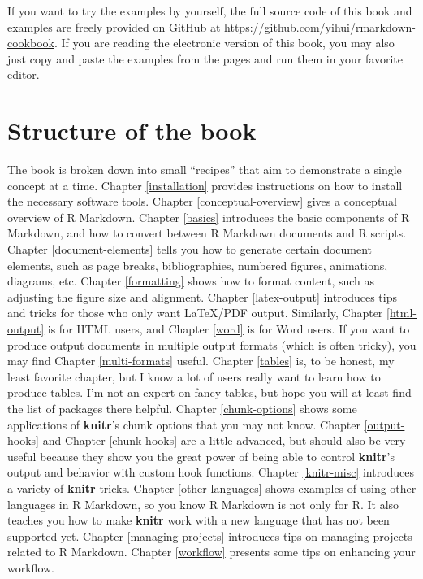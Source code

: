 \documentclass[
  11pt,
]{krantz}
\begin{document}
If you want to try the examples by yourself, the full source code of this book and examples are freely provided on GitHub at \url{https://github.com/yihui/rmarkdown-cookbook}. If you are reading the electronic version of this book, you may also just copy and paste the examples from the pages and run them in your favorite editor.

\hypertarget{structure-of-the-book}{%
\section*{Structure of the book}\label{structure-of-the-book}}


The book is broken down into small ``recipes'' that aim to demonstrate a single concept at a time. Chapter \ref{installation} provides instructions on how to install the necessary software tools. Chapter \ref{conceptual-overview} gives a conceptual overview of R Markdown. Chapter \ref{basics} introduces the basic components of R Markdown, and how to convert between R Markdown documents and R scripts. Chapter \ref{document-elements} tells you how to generate certain document elements, such as page breaks, bibliographies, numbered figures, animations, diagrams, etc. Chapter \ref{formatting} shows how to format content, such as adjusting the figure size and alignment. Chapter \ref{latex-output} introduces tips and tricks for those who only want LaTeX/PDF output. Similarly, Chapter \ref{html-output} is for HTML users, and Chapter \ref{word} is for Word users. If you want to produce output documents in multiple output formats (which is often tricky), you may find Chapter \ref{multi-formats} useful. Chapter \ref{tables} is, to be honest, my least favorite chapter, but I know a lot of users really want to learn how to produce tables. I'm not an expert on fancy tables, but hope you will at least find the list of packages there helpful. Chapter \ref{chunk-options} shows some applications of \textbf{knitr}'s chunk options that you may not know. Chapter \ref{output-hooks} and Chapter \ref{chunk-hooks} are a little advanced, but should also be very useful because they show you the great power of being able to control \textbf{knitr}'s output and behavior with custom hook functions. Chapter \ref{knitr-misc} introduces a variety of \textbf{knitr} tricks. Chapter \ref{other-languages} shows examples of using other languages in R Markdown, so you know R Markdown is not only for R. It also teaches you how to make \textbf{knitr} work with a new language that has not been supported yet. Chapter \ref{managing-projects} introduces tips on managing projects related to R Markdown. Chapter \ref{workflow} presents some tips on enhancing your workflow.
\end{document}
